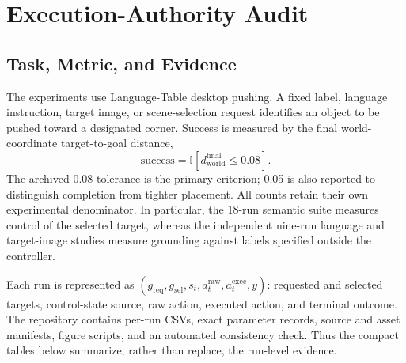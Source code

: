 \documentclass[conference]{IEEEtran}
\newcommand{\distw}{d_{\mathrm{world}}}
\begin{document}
\section{Execution-Authority Audit}
\subsection{Task, Metric, and Evidence}
The experiments use Language-Table desktop pushing. A fixed label, language instruction, target image, or scene-selection request identifies an object to be pushed toward a designated corner. Success is measured by the final world-coordinate target-to-goal distance,
\begin{equation}
  \mathrm{success}=\mathbb{I}[\distw^{\mathrm{final}}\leq0.08].
  \label{eq:success}
\end{equation}
The archived 0.08 tolerance is the primary criterion; 0.05 is also reported to distinguish completion from tighter placement. All counts retain their own experimental denominator. In particular, the 18-run semantic suite measures control of the selected target, whereas the independent nine-run language and target-image studies measure grounding against labels specified outside the controller.

Each run is represented as $(g_{\mathrm{req}},g_{\mathrm{sel}},s_t,a_t^{\mathrm{raw}},a_t^{\mathrm{exec}},y)$: requested and selected targets, control-state source, raw action, executed action, and terminal outcome. The repository contains per-run CSVs, exact parameter records, source and asset manifests, figure scripts, and an automated consistency check. Thus the compact tables below summarize, rather than replace, the run-level evidence.
\end{document}
